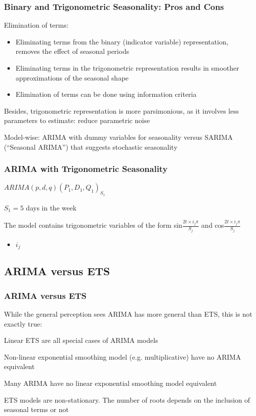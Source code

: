 \documentclass{beamer}
\newenvironment{wideitemize}{\itemize\addtolength{\itemsep}{10pt}}{\enditemize}
\begin{document}
\begin{frame}
  \frametitle{Binary and Trigonometric Seasonality: Pros and Cons}
  \begin{wideitemize}
  \item Elimination of terms:
    \begin{itemize}
    \item Eliminating terms from the binary (indicator variable) representation, removes the effect of seasonal periods
    \item Eliminating terms in the trigonometric representation results in smoother approximations of the seasonal shape 
    \item Elimination of terms can be done using information criteria
    \end{itemize}
  \item Besides, trigonometric representation is more parsimonious, as it involves less parameters to estimate: reduce parametric noise
  \item Model-wise: ARIMA with dummy variables for seasonality versus SARIMA (“Seasonal ARIMA”) that suggests stochastic seasonality
  \end{wideitemize}
\end{frame}


\begin{frame}
  \frametitle{ARIMA with Trigonometric Seasonality}
  \begin{wideitemize}
    \item $ARIMA(p, d, q)(P_1, D_1, Q_1)_{S_1}$
    \item $S_1 = 5$ days in the week
    \item The model contains trigonometric variables of the form sin$\frac{2 t \times i_j \pi}{S_j}$ and cos$\frac{2 t \times i_j \pi}{S_j}$
      \begin{itemize}
      \item $i_j$
      \end{itemize}
  \end{wideitemize}
\end{frame}


\subsection{ARIMA versus ETS}

\begin{frame}
  \frametitle{ARIMA versus ETS}
  While the general perception sees ARIMA has more general than ETS, this is not exactly true:
  \begin{wideitemize}
  \item Linear ETS are all special cases of ARIMA models
  \item Non-linear exponential smoothing model (e.g. multiplicative) have no ARIMA equivalent
  \item Many ARIMA have no linear exponential smoothing model equivalent
  \item ETS models are non-stationary. The number of roots depends on the inclusion of seasonal terms or not
  \end{wideitemize}
\end{frame}
\end{document}
